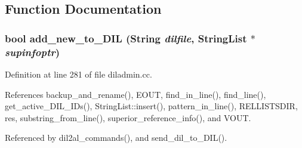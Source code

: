 \subsection{Function Documentation}
\subsubsection{\setlength{\rightskip}{0pt plus 5cm}bool add\_\-new\_\-to\_\-DIL ({\bf String} {\em dilfile}, {\bf String\-List} $\ast$ {\em supinfoptr})}\label{diladmin_8cc_a3}




Definition at line 281 of file diladmin.cc.

References backup\_\-and\_\-rename(), EOUT, find\_\-in\_\-line(), find\_\-line(), get\_\-active\_\-DIL\_\-IDs(), String\-List::insert(), pattern\_\-in\_\-line(), RELLISTSDIR, res, substring\_\-from\_\-line(), superior\_\-reference\_\-info(), and VOUT.

Referenced by dil2al\_\-commands(), and send\_\-dil\_\-to\_\-DIL().



